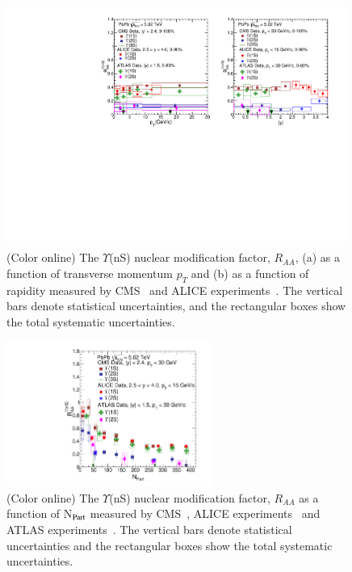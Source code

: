 \begin{figure}
  \includegraphics[width=0.99\textwidth]{Figures/ExpOverview/Fig_LHC_YnSRAAPtRap.pdf}
  \caption{(Color online) The $\Upsilon$(nS) nuclear modification factor, $R_{AA}$, (a) as a function of transverse momentum $p_{T}$
    and (b) as a function of rapidity measured by CMS~\cite{CMS:2018zza} and ALICE experiments~\cite{ALICE:2020wwx}. The vertical bars denote statistical uncertainties, and the rectangular boxes show the total systematic uncertainties.
  }
  \label{fig:LHCYnSRAAPtRap}
\end{figure}


\begin{figure}
  \begin{center}
  \includegraphics[width=0.6\textwidth]{Figures/ExpOverview/Fig_LHC_YnSRAANPart.pdf}
  \caption{(Color online) The $\Upsilon$(nS) nuclear modification factor, $R_{AA}$ as a function of N$_{\rm Part}$
    measured by CMS~\cite{CMS:2018zza}, ALICE experiments~\cite{ALICE:2020wwx} and ATLAS experiments~\cite{ALICE:2020wwx}.
    The vertical bars denote statistical uncertainties and the rectangular boxes show the total systematic uncertainties.
  }
  \label{fig:LHCYnSRAANPart}
  \end{center}
\end{figure}



